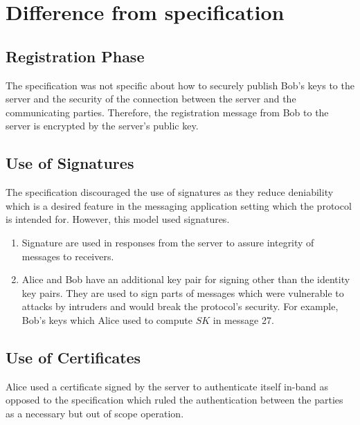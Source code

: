 \section{Difference from specification}
\subsection{Registration Phase}
The specification was not specific about how to securely publish Bob's keys to the server and the security of the connection between the server and the communicating parties. Therefore, the registration message from Bob to the server is encrypted by the server's public key.
\subsection{Use of Signatures}
The specification discouraged the use of signatures as they reduce deniability which is a desired feature in the messaging application setting which the protocol is intended for. However, this model used signatures.
\begin{enumerate}
	\item Signature are used in responses from the server to assure integrity of messages to receivers.
	\item Alice and Bob have an additional key pair for signing other than the identity key pairs. They are used to sign parts of messages which were vulnerable to attacks by intruders and would break the protocol's security. For example, Bob's keys which Alice used to compute $ SK $ in message 27.
\end{enumerate}
\subsection{Use of Certificates}
Alice used a certificate signed by the server to authenticate itself in-band as opposed to the specification which ruled the authentication between the parties as a necessary but out of scope operation.